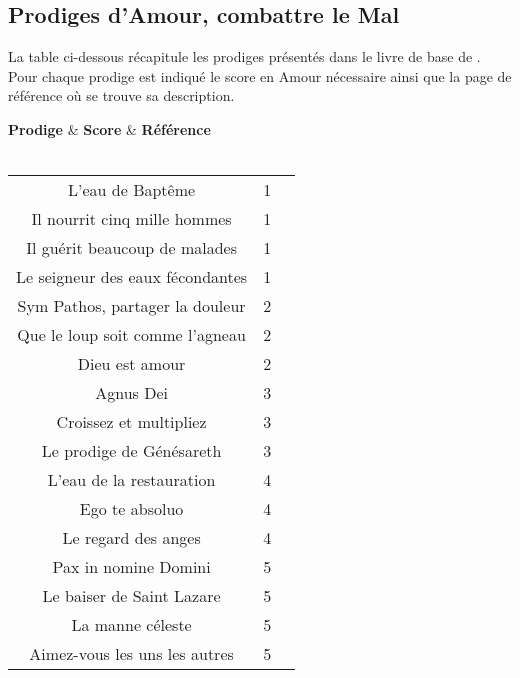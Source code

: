     \subsection{Prodiges d'Amour, combattre le Mal}\label{subsec:prodigesamour}
    La table ci-dessous récapitule les prodiges présentés dans le livre de base de . Pour chaque prodige est indiqué le score en Amour nécessaire ainsi que la page de référence où se trouve sa description.
    \begin{center} 
\tablehead
	{\hline \textbf{Prodige} & \textbf{Score} & \textbf{Référence}\\ \hline}
\tabletail
	{\hline {}\\}
\tablelasttail
	{\hline}
\begin{supertabular}{|c|c|c|}
L'eau de Baptême & 1 & \cite[p.241]{MC} \\ 
Il nourrit cinq mille hommes & 1 & \cite[p.241]{MC} \\ 
Il guérit beaucoup de malades & 1 & \cite[p.241]{MC} \\ 
Le seigneur des eaux fécondantes & 1 & \cite[p.241]{MC} \\ 
Sym Pathos, partager la douleur & 2 & \cite[p.241]{MC} \\
Que le loup soit comme l'agneau & 2 & \cite[p.242]{MC} \\
Dieu est amour & 2 & \cite[p.242]{MC} \\ 
Agnus Dei & 3 & \cite[p.242]{MC} \\ 
Croissez et multipliez & 3 & \cite[p.242]{MC} \\
Le prodige de Génésareth & 3 & \cite[p.242]{MC} \\
L'eau de la restauration & 4 & \cite[p.242]{MC} \\ 
Ego te absoluo & 4 & \cite[p.242]{MC} \\ 
Le regard des anges & 4 & \cite[p.243]{MC} \\
Pax in nomine Domini & 5 & \cite[p.243]{MC} \\
Le baiser de Saint Lazare & 5 & \cite[p.243]{MC} \\ 
La manne céleste & 5 & \cite[p.243]{MC} \\ 
Aimez-vous les uns les autres & 5 & \cite[p.243]{MC} \\

\end{supertabular}
\end{center}
